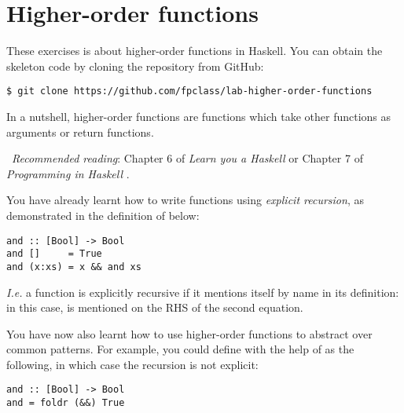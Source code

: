 \section{Higher-order functions}

These exercises is about higher-order functions in Haskell. You can obtain the skeleton code by cloning the repository from GitHub:
\begin{verbatim}
$ git clone https://github.com/fpclass/lab-higher-order-functions
\end{verbatim}
In a nutshell, higher-order functions are functions which take other functions as arguments or return functions.

\makebox[0.5cm]{\faBook}~\emph{Recommended reading}: Chapter 6 of \emph{Learn you a Haskell} \citep{lipovaca2011learn} or Chapter 7 of \emph{Programming in Haskell} \citep{hutton2016programming}.

\taskLine


\taskLine

You have already learnt how to write functions using \emph{explicit recursion}, as demonstrated in the definition of  below:
\begin{verbatim}
and :: [Bool] -> Bool
and []     = True 
and (x:xs) = x && and xs
\end{verbatim}
\emph{I.e.} a function is explicitly recursive if it mentions itself by name in its definition: in this case,  is mentioned on the RHS of the second equation.

You have now also learnt how to use higher-order functions to abstract over common patterns. For example, you could define  with the help of  as the following, in which case the recursion is not explicit:
\begin{verbatim}
and :: [Bool] -> Bool 
and = foldr (&&) True
\end{verbatim} 

